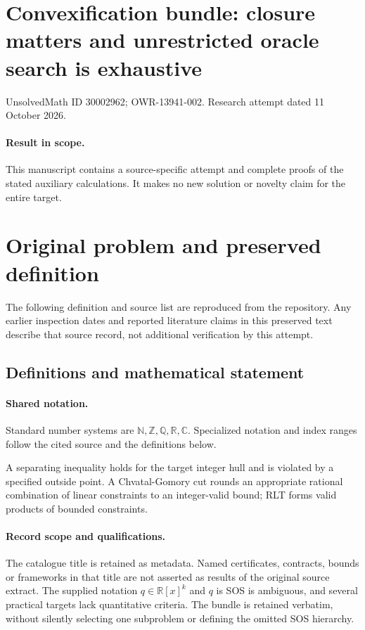 \documentclass[11pt]{article}
\begin{document}
\section*{Convexification bundle: closure matters and unrestricted oracle search is exhaustive}
\noindent UnsolvedMath ID 30002962; OWR-13941-002. Research attempt dated 11 October 2026.
\paragraph{Result in scope.}This manuscript contains a source-specific attempt and complete proofs of the stated auxiliary calculations. It makes no new solution or novelty claim for the entire target.
\section{Original problem and preserved definition}
The following definition and source list are reproduced from the repository. Any earlier inspection dates and reported literature claims in this preserved text describe that source record, not additional verification by this attempt.
\subsection{Definitions and mathematical statement}

\paragraph{Shared notation.}Standard number systems are $\mathbb N,\mathbb Z,\mathbb Q,\mathbb R,\mathbb C$. Specialized notation and index ranges follow the cited source and the definitions below.


A separating inequality holds for the target integer hull and is violated by a specified outside point. A Chvatal-Gomory cut rounds an appropriate rational combination of linear constraints to an integer-valid bound; RLT forms valid products of bounded constraints.
\paragraph{Record scope and qualifications.}
The catalogue title is retained as metadata. Named certificates, contracts, bounds or frameworks in that title are not asserted as results of the original source extract.
The supplied notation $q\in\mathbb R[x]^k$ and $q$ is SOS is ambiguous, and several practical targets lack quantitative criteria. The bundle is retained verbatim, without silently selecting one subproblem or defining the omitted SOS hierarchy.
\end{document}
